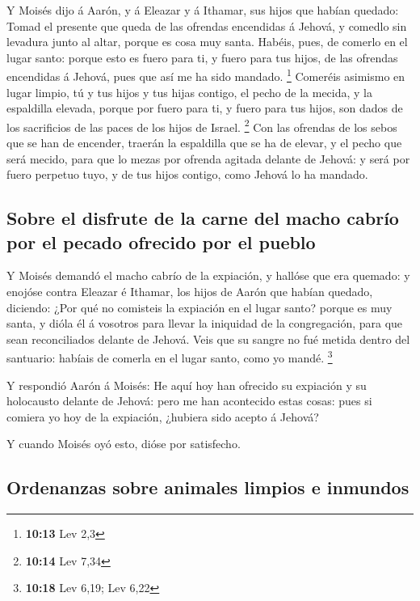  Y Moisés dijo á Aarón, y á Eleazar y á Ithamar, sus hijos
que habían quedado: Tomad el presente que queda de las ofrendas
encendidas á Jehová, y comedlo sin levadura junto al altar, porque es
cosa muy santa.  Habéis, pues, de comerlo en el lugar
santo: porque esto es fuero para ti, y fuero para tus hijos, de las
ofrendas encendidas á Jehová, pues que así me ha sido mandado.
\footnote{\textbf{10:13} Lev 2,3}  Comeréis asimismo en
lugar limpio, tú y tus hijos y tus hijas contigo, el pecho de la mecida,
y la espaldilla elevada, porque por fuero para ti, y fuero para tus
hijos, son dados de los sacrificios de las paces de los hijos de Israel.
\footnote{\textbf{10:14} Lev 7,34}  Con las ofrendas de los
sebos que se han de encender, traerán la espaldilla que se ha de elevar,
y el pecho que será mecido, para que lo mezas por ofrenda agitada
delante de Jehová: y será por fuero perpetuo tuyo, y de tus hijos
contigo, como Jehová lo ha mandado.

\hypertarget{sobre-el-disfrute-de-la-carne-del-macho-cabruxedo-por-el-pecado-ofrecido-por-el-pueblo}{%
\subsection{Sobre el disfrute de la carne del macho cabrío por el pecado
ofrecido por el
pueblo}\label{sobre-el-disfrute-de-la-carne-del-macho-cabruxedo-por-el-pecado-ofrecido-por-el-pueblo}}

 Y Moisés demandó el macho cabrío de la expiación, y
hallóse que era quemado: y enojóse contra Eleazar é Ithamar, los hijos
de Aarón que habían quedado, diciendo:  ¿Por qué no
comisteis la expiación en el lugar santo? porque es muy santa, y dióla
él á vosotros para llevar la iniquidad de la congregación, para que sean
reconciliados delante de Jehová.  Veis que su sangre no fué
metida dentro del santuario: habíais de comerla en el lugar santo, como
yo mandé. \footnote{\textbf{10:18} Lev 6,19; Lev 6,22}

 Y respondió Aarón á Moisés: He aquí hoy han ofrecido su
expiación y su holocausto delante de Jehová: pero me han acontecido
estas cosas: pues si comiera yo hoy de la expiación, ¿hubiera sido
acepto á Jehová?

 Y cuando Moisés oyó esto, dióse por satisfecho.

\hypertarget{ordenanzas-sobre-animales-limpios-e-inmundos}{%
\subsection{Ordenanzas sobre animales limpios e
inmundos}\label{ordenanzas-sobre-animales-limpios-e-inmundos}}

